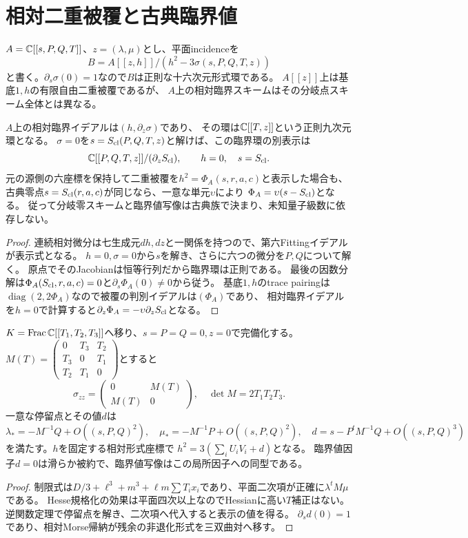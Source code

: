 \section{相対二重被覆と古典臨界値}
$A=\mathbb C[[s,P,Q,T]]$、$z=(\lambda,\mu)$とし、平面incidenceを
\[
 B=A[[z,h]]/(h^2-3\sigma(s,P,Q,T,z))
\]
と書く。$\partial_s\sigma(0)=1$なので$B$は正則な十六次元形式環である。
$A[[z]]$上は基底$1,h$の有限自由二重被覆であるが、
$A$上の相対臨界スキームはその分岐点スキーム全体とは異なる。
\begin{proposition}
$A$上の相対臨界イデアルは$(h,\partial_z\sigma)$であり、
その環は$\mathbb C[[T,z]]$という正則九次元環となる。
$\sigma=0$を$s=S_{\rm cl}(P,Q,T,z)$と解けば、この臨界環の別表示は
\[
 \mathbb C[[P,Q,T,z]]/(\partial_zS_{\rm cl}),\qquad h=0,\quad s=S_{\rm cl}.
\]
元の源側の六座標を保持して二重被覆を$h^2=\Phi_A(s,r,a,c)$と表示した場合も、
古典零点$s=S_{\rm cl}(r,a,c)$が同じなら、一意な単元$\upsilon$により
$\Phi_A=\upsilon(s-S_{\rm cl})$となる。
従って分岐零スキームと臨界値写像は古典族で決まり、未知量子級数に依存しない。
\end{proposition}
\begin{proof}
連続相対微分は七生成元$dh,dz$と一関係を持つので、第六Fittingイデアルが表示式となる。
$h=0,\sigma=0$から$s$を解き、さらに六つの微分を$P,Q$について解く。
原点でそのJacobianは恒等行列だから臨界環は正則である。
最後の因数分解は$\Phi_A(S_{\rm cl},r,a,c)=0$と$\partial_s\Phi_A(0)\ne0$から従う。
基底$1,h$のtrace pairingは$\operatorname{diag}(2,2\Phi_A)$なので被覆の判別イデアルは$(\Phi_A)$であり、
相対臨界イデアルを$h=0$で計算すると$\partial_z\Phi_A=-\upsilon\partial_zS_{\rm cl}$となる。
\end{proof}

\begin{proposition}[一般T方向のMorse模型]
$K=\operatorname{Frac}\mathbb C[[T_1,T_2,T_3]]$へ移り、$s=P=Q=0,z=0$で完備化する。
$M(T)=\left(\begin{smallmatrix}0&T_3&T_2\\T_3&0&T_1\\T_2&T_1&0\end{smallmatrix}\right)$とすると
\[
 \sigma_{zz}=\begin{pmatrix}0&M(T)\\M(T)&0\end{pmatrix},\quad\det M=2T_1T_2T_3.
\]
一意な停留点とその値$d$は
\[
 \lambda_*=-M^{-1}Q+O((s,P,Q)^2),\quad
 \mu_*=-M^{-1}P+O((s,P,Q)^2),\quad
 d=s-P^tM^{-1}Q+O((s,P,Q)^3)
\]
を満たす。$h$を固定する相対形式座標で
$h^2=3(\sum_iU_iV_i+d)$となる。
臨界値因子$d=0$は滑らか被約で、臨界値写像はこの局所因子への同型である。
\end{proposition}
\begin{proof}
制限式は$D/3+\ell^3+m^3+\ell m\sum T_ix_i$であり、平面二次項が正確に$\lambda^tM\mu$である。
Hesse規格化の効果は平面四次以上なのでHessianに高い$T$補正はない。
逆関数定理で停留点を解き、二次項へ代入すると表示の値を得る。
$\partial_sd(0)=1$であり、相対Morse帰納が残余の非退化形式を三双曲対へ移す。
\end{proof}

